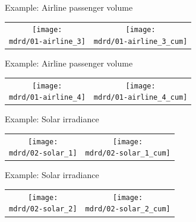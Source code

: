 \begin{frame}{Example: Airline passenger volume}
\newcommand{\wmgd}{0.5\columnwidth}
\newcommand{\hmgd}{3.0cm}
\newcommand{\mdrd}{figures/01-airline}
\newcommand{\mbm}{\hspace{-0.3cm}}
{\footnotesize

}

\vspace{\baselineskip}

\begin{tabular}{cc}
\mbm \texttt{[image: \\mdrd/01-airline\_3]} & \texttt{[image: \\mdrd/01-airline\_3\_cum]}
\end{tabular}
\end{frame}

\begin{frame}{Example: Airline passenger volume}
\newcommand{\wmgd}{0.5\columnwidth}
\newcommand{\hmgd}{3.0cm}
\newcommand{\mdrd}{figures/01-airline}
\newcommand{\mbm}{\hspace{-0.3cm}}
{\footnotesize

}

\vspace{\baselineskip}

\begin{tabular}{cc}
\mbm \texttt{[image: \\mdrd/01-airline\_4]} & \texttt{[image: \\mdrd/01-airline\_4\_cum]}
\end{tabular}
\end{frame}

\begin{frame}{Example: Solar irradiance}
\newcommand{\wmgd}{0.5\columnwidth}
\newcommand{\hmgd}{3.0cm}
\newcommand{\mdrd}{figures/02-solar}
\newcommand{\mbm}{\hspace{-0.3cm}}
{\footnotesize

}

\vspace{\baselineskip}

\begin{tabular}{cc}
\mbm \texttt{[image: \\mdrd/02-solar\_1]} & \texttt{[image: \\mdrd/02-solar\_1\_cum]}
\end{tabular}
\end{frame}

\begin{frame}{Example: Solar irradiance}
\newcommand{\wmgd}{0.5\columnwidth}
\newcommand{\hmgd}{3.0cm}
\newcommand{\mdrd}{figures/02-solar}
\newcommand{\mbm}{\hspace{-0.3cm}}
{\footnotesize

}

\vspace{\baselineskip}

\begin{tabular}{cc}
\mbm \texttt{[image: \\mdrd/02-solar\_2]} & \texttt{[image: \\mdrd/02-solar\_2\_cum]}
\end{tabular}
\end{frame}

